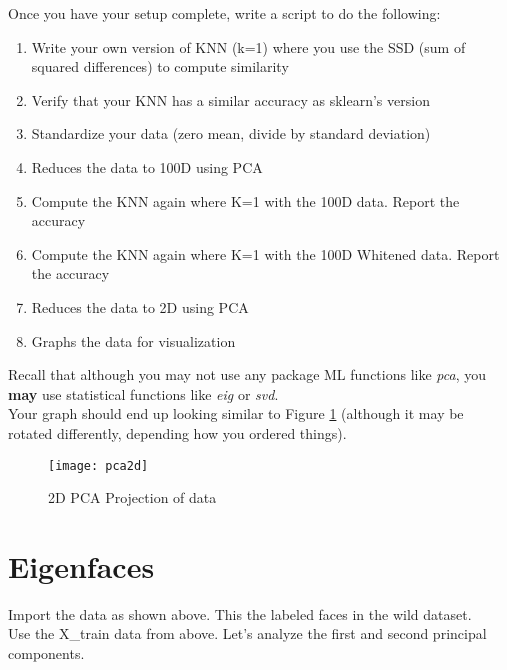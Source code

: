 \documentclass[12pt]{article}
\begin{document}
\noindent
Once you have your setup complete, write a script to do the following:
\begin{enumerate}
  \item Write your own version of KNN (k=1) where you use the SSD (sum of squared differences) to compute similarity
  \item Verify that your KNN has a similar accuracy as sklearn's version
  \item Standardize your data (zero mean, divide by standard deviation)
  \item Reduces the data to 100D using PCA
  \item Compute the KNN again where K=1 with the 100D data.  Report the accuracy
  \item Compute the KNN again where K=1 with the 100D Whitened data.  Report the accuracy
   \item Reduces the data to 2D using PCA
  \item Graphs the data for visualization
\end{enumerate}

\noindent
Recall that although you may not use any package ML functions like \emph{pca}, you \textbf{may} use statistical functions like \emph{eig} or \emph{svd}.\\

\noindent
Your graph should end up looking similar to Figure \ref{PCA} (although it may be rotated differently, depending how you ordered things).
\begin{figure}[H]
\begin{center}
\texttt{[image: pca2d]}
\caption{2D PCA Projection of data}
\label{PCA}
\end{center}
\end{figure}

\newpage
\section{Eigenfaces}\label{eigenface}
Import the data as shown above.  This the labeled faces in the wild dataset.  \\
Use the X\_train data from above.  Let's analyze the first and second principal components.\\

\noindent
\end{document}
